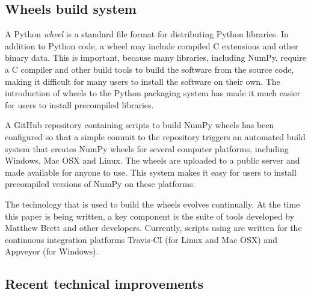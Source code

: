 
\subsection*{Wheels build system}

A Python \emph{wheel}\cite{PEP427} is a standard file format for
distributing Python libraries.  In addition to Python code, a
wheel may include compiled C extensions and other binary data.
This is important, because many libraries, including NumPy,
require a C compiler and other build tools to build the software
from the source code, making it difficult for many users to install
the software on their own.  The introduction of wheels to the Python
packaging system has made it much easier for users to install
precompiled libraries.

A GitHub repository containing scripts to build NumPy wheels has
been configured so that a simple commit to the repository triggers
an automated build system that creates NumPy wheels for several
computer platforms, including Windows, Mac OSX and Linux.  The wheels
are uploaded to a public server and made available for anyone to use.
This system makes it easy for users to install precompiled versions
of NumPy on these platforms.

The technology that is used to build the wheels evolves continually.
At the time this paper is being written, a key component is the
 suite of tools developed by Matthew Brett and
other developers\cite{multibuild}.  Currently, scripts using
 are written for the continuous integration
platforms Travis-CI (for Linux and Mac OSX) and Appveyor
(for Windows).

\subsection*{Recent technical improvements}

